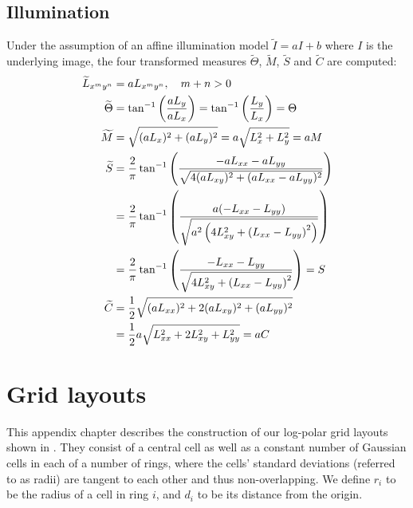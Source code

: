 \documentclass[thesis.tex]{subfiles}
\begin{document}
\section{Illumination} \label{apx:illumination}
%
Under the assumption of an affine illumination model $\widetilde{I} = aI + b$ where $I$ is the underlying image, the four transformed measures $\widetilde{\Theta}$, $\widetilde{M}$, $\widetilde{S}$ and $\widetilde{C}$ are computed:
%
\begin{align*}
  \widetilde{L}_{x^m y^n} &= a L_{x^m y^n}, \quad m+n > 0 \\
  \widetilde{\Theta} &= \tan^{-1} \left( \frac{a L_y}{a L_x} \right) = \tan^{-1} \left( \frac{L_y}{L_x} \right) = \Theta \\
  \widetilde{M} &= \sqrt{(a L_x)^2 + (a L_y)^2} = a \sqrt{L_x^2 + L_y^2} = a M \\
  \widetilde{S} &= \frac{2}{\pi} \tan^{-1} \left( \frac{-a L_{xx} - a L_{yy}}{\sqrt{4(aL_{xy})^2 + (aL_{xx} - aL_{yy})^2}} \right) \\
  &= \frac{2}{\pi} \tan^{-1} \left( \frac{a (-L_{xx} - L_{yy})}{\sqrt{a^2 \left(4L_{xy}^2 + \left(L_{xx} - L_{yy} \right)^2 \right)}} \right) \\
  &= \frac{2}{\pi} \tan^{-1} \left( \frac{-L_{xx} - L_{yy}}{\sqrt{4L_{xy}^2 + \left(L_{xx} - L_{yy} \right)^2}} \right) = S \\
  \widetilde{C} &= \frac12 \sqrt{(a L_{xx})^2 + 2 (a L_{xy})^2 + (a L_{yy})^2} \\
  &= \frac12 a \sqrt{L_{xx}^2 + 2 L_{xy}^2 + L_{yy}^2} = a C
\end{align*}
%
%

\chapter{Grid layouts}
\label{apx:gridLayouts}
%
This appendix chapter describes the construction of our log-polar grid layouts shown in . They consist of a central cell as well as a constant number of Gaussian cells in each of a number of rings, where the cells' standard deviations (referred to as radii) are tangent to each other and thus non-overlapping. We define $r_i$ to be the radius of a cell in ring $i$, and $d_i$ to be its distance from the origin.
%
\end{document}
